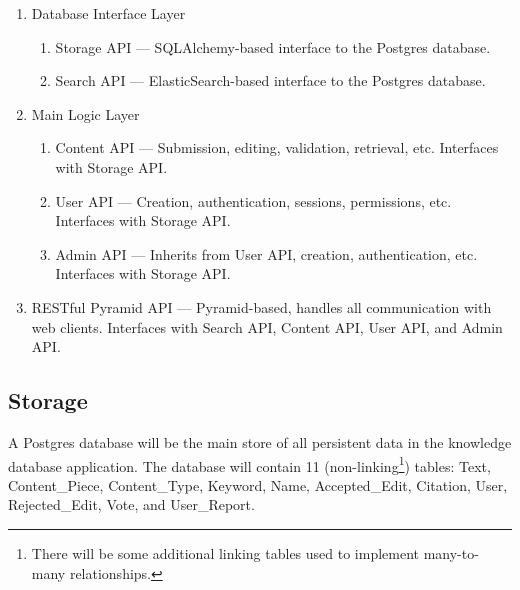 \documentclass[12pt,letterpaper]{article}
\begin{document}
\begin{enumerate}
\item[1.] Database Interface Layer
\begin{enumerate}
\item[(a)] Storage API --- SQLAlchemy-based interface to the Postgres database.
\item[(b)] Search API --- ElasticSearch-based interface to the Postgres database.
\end{enumerate}
\item[2.] Main Logic Layer 
\begin{enumerate}
\item[(a)] Content API --- Submission, editing, validation, retrieval, etc. Interfaces with Storage API. 
\item[(b)] User API --- Creation, authentication, sessions, permissions, etc. Interfaces with Storage API.
\item[(c)] Admin API --- Inherits from User API, creation, authentication, etc. Interfaces with Storage API.
\end{enumerate}
\item[3.] RESTful Pyramid API --- Pyramid-based, handles all communication with web clients. Interfaces with Search API, Content API, User API, and Admin API. 
\end{enumerate}


\subsection{Storage}

A Postgres database will be the main store of all persistent data in the knowledge database application. The database will contain 11 (non-linking\footnote{There will be some additional linking tables used to implement many-to-many relationships.}) tables: Text, Content\_Piece, Content\_Type, Keyword, Name, Accepted\_Edit, Citation, User, Rejected\_Edit, Vote, and User\_Report.

\renewcommand{\arraystretch}{1.8}
\end{document}
